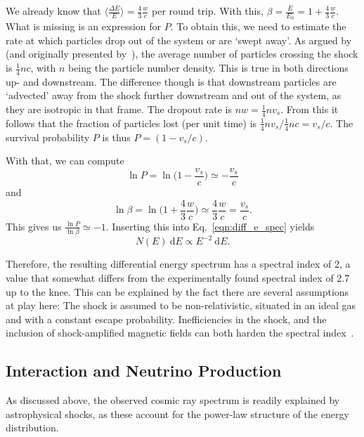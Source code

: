 We already know that $\big\langle\frac{\Delta E}{E}\big\rangle = \frac{4}{3}\frac{w}{c}$ per round trip. With this, $\beta = \frac{E}{E_0} = 1 + \frac{4}{3}\frac{w}{c}$. What is missing is an expression for $P$. To obtain this, we need to estimate the rate at which particles drop out of the system or are `swept away'. As argued by~\cite{Longair2011} (and originally presented by~), the average number of particles crossing the shock is $\frac{1}{4} n c$, with $n$ being the particle number density. This is true in both directions up- and downstream. The difference though is that downstream particles are `advected' away from the shock further downstream and out of the system, as they are isotropic in that frame. The dropout rate is $n w=\frac{1}{4}nv_s$. From this it follows that the fraction of particles lost (per unit time) is $\frac{1}{4} n v_s/\frac{1}{4}nc = v_s/c$. The survival probability $P$ is thus $P=(1-v_s/c)$.

With that, we can compute
\begin{equation}
  \ln P = \ln \big( 1-\frac{v_s}{c}\big) \simeq -\frac{v_s}{c}
\end{equation}
and
\begin{equation}
  \ln \beta = \ln \bigl( 1+\frac{4}{3}\frac{w}{c} \bigr)  \simeq \frac{4}{3}\frac{w}{c} = \frac{v_s}{c}.
\end{equation}
This gives us $\frac{\ln P}{\ln \beta} \simeq -1$. Inserting this into Eq.~\ref{eqn:diff_e_spec} yields
\begin{equation}
  N(E)~\text{d} E \propto E^{-2}~\text{d} E.
\end{equation}

Therefore, the resulting differential energy spectrum has a spectral index of 2, a value that somewhat differs from the experimentally found spectral index of 2.7 up to the knee. This can be explained by the fact there are several assumptions at play here: The shock is assumed to be non-relativistic, situated in an ideal gas and with a constant escape probability. Inefficiencies in the shock, and the inclusion of shock-amplified magnetic fields can both harden the spectral index~\cite{Spurio2018}.

\subsection{Interaction and Neutrino Production}\label{cr_interactions}
As discussed above, the observed cosmic ray spectrum is readily explained by astrophysical shocks, as these account for the power-law structure of the energy distribution.

